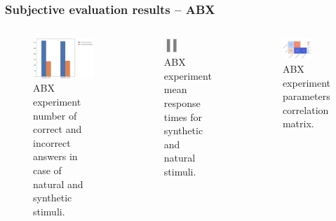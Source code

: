 \documentclass[a4paper,9pt]{beamer}
\theoremstyle{mytheoremstyle}
\begin{document}
\begin{frame}
\frametitle{Subjective evaluation results -- ABX}
\begin{columns}
\begin{figure}
\begin{center}
  \includegraphics[width=\textwidth]{res/ABX_stimulus_type_correct_answers}
\end{center}
	\caption{ABX experiment number of correct and incorrect answers in case of natural and synthetic stimuli.}
\end{figure}
\begin{figure}
\begin{center}
  \includegraphics[width=0.3\textwidth]{res/ABX_stimulus_type_mean_response_time}
\end{center}
	\caption{ABX experiment mean response times for synthetic and natural stimuli.}
\end{figure}
\begin{figure}
\begin{center}
  \includegraphics[width=0.6\textwidth]{res/ABX_correlation_matrix}
\end{center}
	\caption{ABX experiment parameters correlation matrix.}
\end{figure}
\end{columns}
\end{frame}
\end{document}
